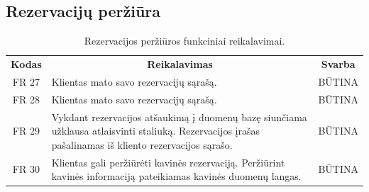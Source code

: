 \documentclass{VUMIFPSkursinis}
\begin{document}
\pagebreak

\subsection{Rezervacijų peržiūra}
\begin{center}
	\begin{table}[H]
	\caption{Rezervacijos peržiūros funkciniai reikalavimai.}
	\begin{tabular}{|p{2cm}|p{}|p{}|}
	
	\hline
	    \rowcolor{lightgray}
		\multicolumn{3}{|c|}{Rezervacijų priežiūra}\\
		
	\hline
		\multicolumn{1}{|c|}{{\bfseries Kodas}}&
		\multicolumn{1}{|c|}{{\bfseries Reikalavimas}}&
		\multicolumn{1}{|c|}{{\bfseries Svarba}}\\

	\hline
	
		\multicolumn{1}{|c|}{FR 27}&
		{Klientas mato savo rezervacijų sąrašą.}&
		\multicolumn{1}{|c|}{BŪTINA}\\				
	\hline
	
		\multicolumn{1}{|c|}{FR 28}&
		{Klientas mato savo rezervacijų sąrašą.}&
		\multicolumn{1}{|c|}{BŪTINA}\\				
	\hline
	
		\multicolumn{1}{|c|}{FR 29}&
		{Vykdant rezervacijos atšaukimą į duomenų bazę siunčiama užklausa atlaisvinti staliuką. Rezervacijos įrašas pašalinamas iš kliento rezervacijos sąrašo.}&
		\multicolumn{1}{|c|}{BŪTINA}\\				
	\hline
	
		\multicolumn{1}{|c|}{FR 30}&
		{Klientas gali peržiūrėti kavinės rezervaciją. Peržiūrint kavinės informaciją pateikiamas kavinės duomenų langas.}&
		\multicolumn{1}{|c|}{BŪTINA}\\				
	\hline		
	
	\end{tabular}		
	
	\label{tabel:RezervacijosPeržiūra}
	\end{table}


\end{center}
\end{document}

